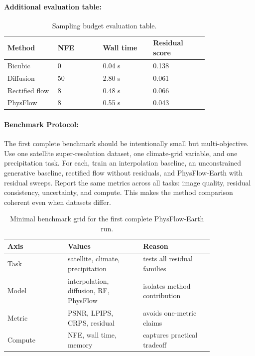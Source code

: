 \documentclass{article}
\begin{document}
\paragraph{Additional evaluation table:}

\begin{table}[t]
\centering
\caption{Sampling budget evaluation table.}
\begin{tabular}{@{}p{0.20\linewidth}p{0.18\linewidth}p{0.20\linewidth}p{0.22\linewidth}@{}}
\toprule
\textbf{Method} & \textbf{NFE} & \textbf{Wall time} & \textbf{Residual score}\\
\midrule
Bicubic & 0 & 0.04 s & 0.138\\
Diffusion & 50 & 2.80 s & 0.061\\
Rectified flow & 8 & 0.48 s & 0.066\\
PhysFlow & 8 & 0.55 s & 0.043\\
\bottomrule
\end{tabular}
\end{table}

\paragraph{Benchmark Protocol:}

The first complete benchmark should be intentionally small but multi-objective. Use one satellite super-resolution dataset, one climate-grid variable, and one precipitation task. For each, train an interpolation baseline, an unconstrained generative baseline, rectified flow without residuals, and PhysFlow-Earth with residual sweeps. Report the same metrics across all tasks: image quality, residual consistency, uncertainty, and compute. This makes the method comparison coherent even when datasets differ.

\begin{table}[t]
\centering
\caption{Minimal benchmark grid for the first complete PhysFlow-Earth run.}
\begin{tabular}{@{}p{0.24\linewidth}p{0.30\linewidth}p{0.28\linewidth}@{}}
\toprule
\textbf{Axis} & \textbf{Values} & \textbf{Reason}\\
\midrule
Task & satellite, climate, precipitation & tests all residual families\\
Model & interpolation, diffusion, RF, PhysFlow & isolates method contribution\\
Metric & PSNR, LPIPS, CRPS, residual & avoids one-metric claims\\
Compute & NFE, wall time, memory & captures practical tradeoff\\
\bottomrule
\end{tabular}
\end{table}
\end{document}
